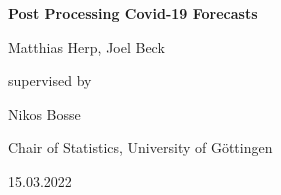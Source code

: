 \begin{titlepage}
  \begin{center}
    \vspace*{1cm}
    
    \Huge
    \textbf{Post Processing Covid-19 Forecasts}
    
    \vspace{1.5cm}
    
    Matthias Herp, Joel Beck
    
    \vspace{1.5cm}
    
    \Large
    supervised by
    
    \vspace{0.5cm}
    
    Nikos Bosse
    
    \vspace{2.5cm}
    
    Chair of Statistics, University of G\"ottingen
    
    \vspace{0.5cm}
    
    15.03.2022
            
  \end{center}
\end{titlepage}

\newpage

\renewcommand{\contentsname}{Table of Contents}
\tableofcontents

\newpage

